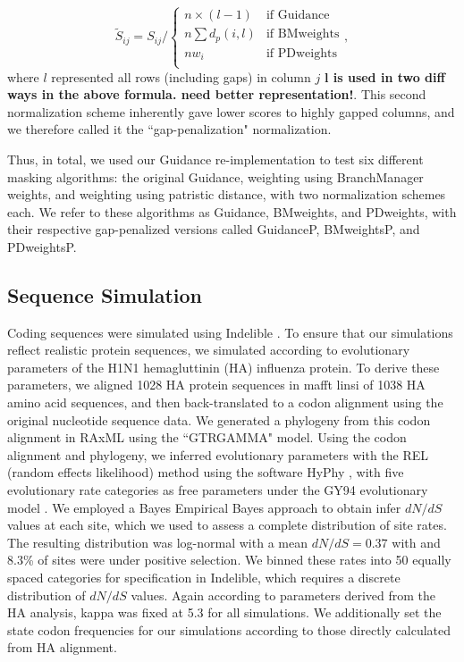 \documentclass[10pt]{article}
\begin{document}
\begin{equation} \widetilde{S}_{ij} = S_{ij} \bigg/ \left\{ \begin{array}{rl}
              n\times (l-1)                                   &\mbox{if Guidance} \\
              n\sum d_p(i,l)                         &\mbox{if BMweights} \\
   		  nw_i                                       &\mbox{if PDweights} \\          
         \end{array} \right.,
\end{equation}
where $l$ represented all rows (including gaps) in column $j$ \textbf{l is used in two diff ways in the above formula. need better representation!}. This second normalization scheme inherently gave lower scores to highly gapped columns, and we therefore called it the ``gap-penalization" normalization.

Thus, in total, we used our Guidance re-implementation to test six different masking algorithms: the original Guidance, weighting using BranchManager weights, and weighting using patristic distance, with two normalization schemes each. We refer to these algorithms as Guidance, BMweights, and PDweights, with their respective gap-penalized versions called GuidanceP, BMweightsP, and PDweightsP.



\subsection*{Sequence Simulation}
Coding sequences were simulated using Indelible \citep{Fletcher2009}. To ensure that our simulations reflect realistic protein sequences, we simulated according to evolutionary parameters of the H1N1 hemagluttinin (HA) influenza protein. To derive these parameters, we aligned 1028 HA protein sequences in mafft linsi \citep{Katoh2005} of 1038 HA amino acid sequences, and then back-translated to a codon alignment using the original nucleotide sequence data. We generated a phylogeny from this codon alignment in RAxML \citep{Stamatakis2006} using the ``GTRGAMMA" model. Using the codon alignment and phylogeny, we inferred evolutionary parameters with the REL (random effects likelihood)  method \citep{NielsenYang1998} using the software HyPhy \citep{Pond2005}, with five evolutionary rate categories as free parameters under the GY94 evolutionary model \citep{GoldmanYang1994}. We employed a Bayes Empirical Bayes approach \citep{Yang2000} to obtain infer $dN/dS$ values at each site, which we used to assess a complete distribution of site rates. The resulting distribution was log-normal with a mean $dN/dS = 0.37$ with and 8.3\% of sites were under positive selection. We binned these rates into 50 equally spaced categories for specification in Indelible, which requires a discrete distribution of $dN/dS$ values. Again according to parameters derived from the HA analysis, kappa was fixed at 5.3 for all simulations. We additionally set the state codon frequencies for our simulations according to those directly calculated from HA alignment. 
\end{document}
